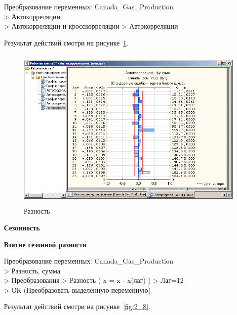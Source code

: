 Преобразование переменных: Canada\_Gas\_Production\\
> Автокорреляции\\
> Автокорреляции и кросскорреляции > Автокорреляции

Результат действий смотри на рисунке~\ref{fig:2_7}.

\begin{figure}[!h]
  \centering

  \includegraphics[height=8cm]
  {inc/Canada_Gas_Production/7.PNG}

  \caption{Разность}

  \label{fig:2_7}
\end{figure}


\newpage

\begin{center}
  \textbf{Сезонность}
\end{center}

\begin{center}
  \textbf{Взятие сезонной разности}
\end{center}

Преобразование переменных: Canada\_Gas\_Production\\
> Разность, сумма\\
> Преобразования  > Разность ( x = x - x(лаг) ) > Лаг=12\\
> ОК (Преобразовать выделенную переменную)

Результат действий смотри на рисунке~\ref{fig:2_8}.

